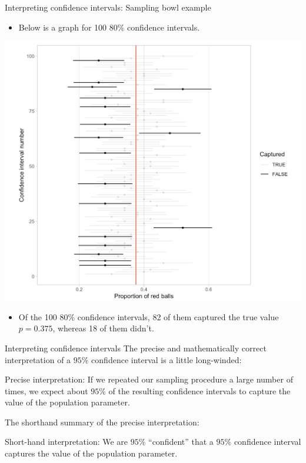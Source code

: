 \documentclass[
  ignorenonframetext,
]{beamer}
\providecommand{\tightlist}{%
  \setlength{\itemsep}{0pt}\setlength{\parskip}{0pt}}
\begin{document}
\begin{frame}{Interpreting confidence intervals: Sampling bowl example}
\protect\hypertarget{interpreting-confidence-intervals-sampling-bowl-example-1}{}
\begin{itemize}
\tightlist
\item
  Below is a graph for 100 \(80\%\) confidence intervals.
\end{itemize}

\tiny

\begin{center}\includegraphics[width=0.6\linewidth,height=0.5\textheight]{week10_12} \end{center}
\normalsize

\begin{itemize}
\tightlist
\item
  Of the 100 \(80\%\) confidence intervals, 82 of them captured the true
  value \(p=0.375\), whereas 18 of them didn't.
\end{itemize}
\end{frame}

\begin{frame}{Interpreting confidence intervals}
\protect\hypertarget{interpreting-confidence-intervals-4}{}
The precise and mathematically correct interpretation of a \(95\%\)
confidence interval is a little long-winded:

\begin{tcolorbox}
Precise interpretation: If we repeated our sampling procedure a large number of times, we expect about $95\%$ of the resulting confidence intervals to capture the value of the population parameter.
\end{tcolorbox}

The shorthand summary of the precise interpretation:

\begin{tcolorbox}
Short-hand interpretation: We are $95\%$ “confident” that a $95\%$ confidence interval captures the value of the population parameter.
\end{tcolorbox}
\end{frame}
\end{document}
